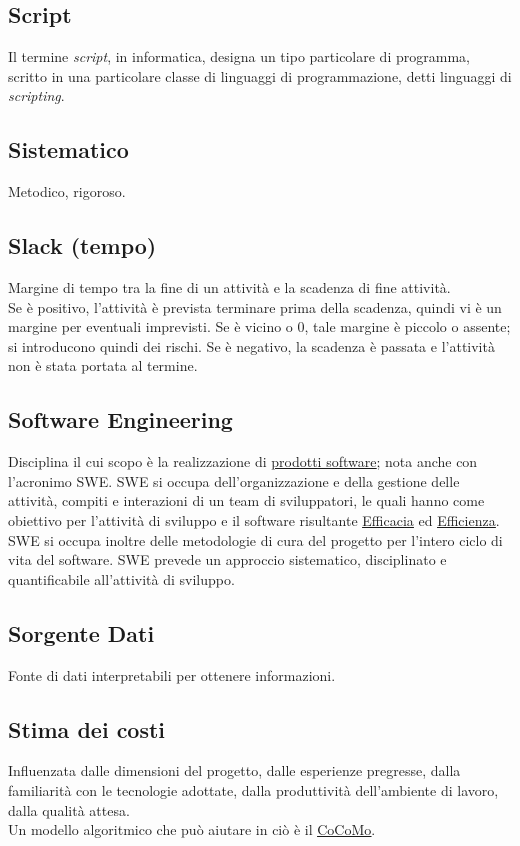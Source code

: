 	\subsection{Script}
	\label{sec:script}
	Il termine \emph{script}, in informatica, designa un tipo particolare di programma, scritto in una particolare classe di linguaggi di programmazione, detti linguaggi di \emph{scripting}.


	\subsection{Sistematico}
	\label{sec:sistematico}
	Metodico, rigoroso.


	\subsection{Slack (tempo)}
	\label{sec:slackt}
	Margine di tempo tra la fine di un attività e la scadenza di fine attività. \\
	Se è positivo, l'attività è prevista terminare prima della scadenza, quindi vi è un margine per eventuali imprevisti. Se è vicino o 0, tale margine è piccolo o assente; si introducono quindi dei rischi. Se è negativo, la scadenza è passata e l'attività non è stata portata al termine.


	\subsection{Software Engineering}
	\label{sec:swe}
	Disciplina il cui scopo è la realizzazione di  \underline{\hyperref[sec:prodottosoftware]{prodotti software}}; nota anche con l'acronimo SWE.
	SWE si occupa dell'organizzazione e della gestione delle attività, compiti e interazioni di un team di sviluppatori,
	le quali hanno come obiettivo per l'attività di sviluppo e il software risultante \underline{\hyperref[sec:efficacia]{Efficacia}} ed \underline{\hyperref[sec:efficienza]{Efficienza}}.
	SWE si occupa inoltre delle metodologie di cura del progetto per l'intero ciclo di vita del software.
	SWE prevede un approccio sistematico, disciplinato e quantificabile all'attività di sviluppo.


	\subsection{Sorgente Dati}
	\label{sec:sorgentedati}
	Fonte di dati interpretabili per ottenere informazioni.


	\subsection{Stima dei costi}
	\label{sec:stimacosti}
	Influenzata dalle dimensioni del progetto, dalle esperienze pregresse, dalla familiarità con le tecnologie adottate, dalla produttività dell'ambiente di lavoro, dalla qualità attesa. \\Un modello algoritmico che può aiutare in ciò è il \underline{\hyperref[sec:cocomo]{CoCoMo}}.


